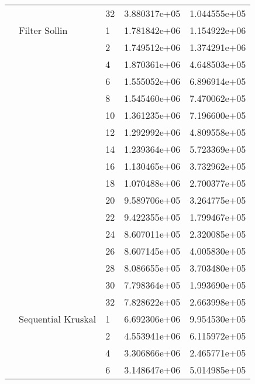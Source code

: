 \begin{tabular}{lllrr}
                      &                     & 32 &  3.880317e+05 &  1.044555e+05 \\
                      & Filter Sollin & 1  &  1.781842e+06 &  1.154922e+06 \\
                      &                     & 2  &  1.749512e+06 &  1.374291e+06 \\
                      &                     & 4  &  1.870361e+06 &  4.648503e+05 \\
                      &                     & 6  &  1.555052e+06 &  6.896914e+05 \\
                      &                     & 8  &  1.545460e+06 &  7.470062e+05 \\
                      &                     & 10 &  1.361235e+06 &  7.196600e+05 \\
                      &                     & 12 &  1.292992e+06 &  4.809558e+05 \\
                      &                     & 14 &  1.239364e+06 &  5.723369e+05 \\
                      &                     & 16 &  1.130465e+06 &  3.732962e+05 \\
                      &                     & 18 &  1.070488e+06 &  2.700377e+05 \\
                      &                     & 20 &  9.589706e+05 &  3.264775e+05 \\
                      &                     & 22 &  9.422355e+05 &  1.799467e+05 \\
                      &                     & 24 &  8.607011e+05 &  2.320085e+05 \\
                      &                     & 26 &  8.607145e+05 &  4.005830e+05 \\
                      &                     & 28 &  8.086655e+05 &  3.703480e+05 \\
                      &                     & 30 &  7.798364e+05 &  1.993690e+05 \\
                      &                     & 32 &  7.828622e+05 &  2.663998e+05 \\
                      & Sequential Kruskal & 1  &  6.692306e+06 &  9.954530e+05 \\
                      &                     & 2  &  4.553941e+06 &  6.115972e+05 \\
                      &                     & 4  &  3.306866e+06 &  2.465771e+05 \\
                      &                     & 6  &  3.148647e+06 &  5.014985e+05 \\

\end{tabular}

